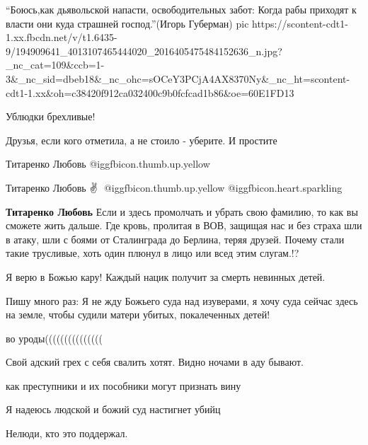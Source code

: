 
\enquote{Боюсь,как дьявольской напасти, освободительных забот: Когда рабы приходят к власти они куда страшней господ.}(Игорь Губерман)
\ifcmt
  pic https://scontent-cdt1-1.xx.fbcdn.net/v/t1.6435-9/194909641_4013107465444020_2016405475484152636_n.jpg?_nc_cat=109&ccb=1-3&_nc_sid=dbeb18&_nc_ohc=sOCeY3PCjA4AX8370Ny&_nc_ht=scontent-cdt1-1.xx&oh=c38420f912ca032400c9b0fcfcad1b86&oe=60E1FD13
\fi


Ублюдки брехливые!


Друзья, если кого отметила, а не стоило - уберите. И простите

Титаренко Любовь  @igg{fbicon.thumb.up.yellow} 

Титаренко Любовь  ✌ ️  @igg{fbicon.thumb.up.yellow}  @igg{fbicon.heart.sparkling} 


\textbf{Титаренко Любовь} Если и здесь промолчать и убрать свою фамилию, то как
вы сможете жить дальше. Где кровь, пролитая в ВОВ, защищая нас и без страха шли
в атаку, шли с боями от Сталинграда до Берлина, теряя друзей. Почему стали
такие трусливые, хоть один плюнул в лицо или всед этим слугам.!?


Я верю в Божью кару! Каждый нацик получит за смерть невинных детей.


Пишу много раз: Я не жду Божьего суда над изуверами, я хочу суда сейчас здесь
на земле, чтобы судили матери убитых, покалеченных детей!


во уроды(((((((((((((((


Свой адский грех с себя свалить хотят. Видно ночами в аду бывают.


как преступники и их пособники могут признать вину


Я надеюсь людской и божий суд настигнет убийц


Нелюди, кто это поддержал.


